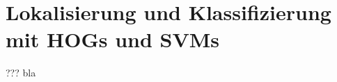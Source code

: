 \section{Lokalisierung und Klassifizierung mit HOGs und SVMs}
\begin{frame}[t,fragile]{???}
	bla
\end{frame}
